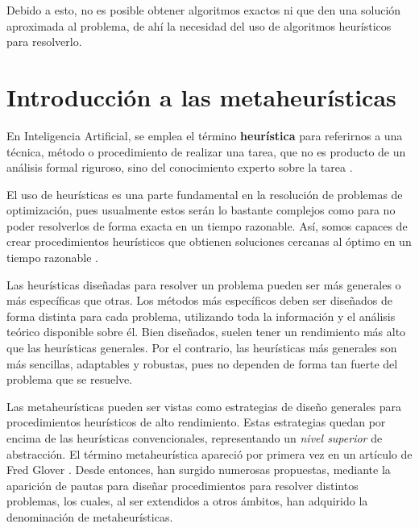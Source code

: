 Debido a esto, no es posible obtener algoritmos exactos ni que den una solución
aproximada al problema, de ahí la necesidad del uso de algoritmos heurísticos para
resolverlo.

\section{Introducción a las metaheurísticas}

En Inteligencia Artificial, se emplea el término \textbf{heurística} para referirnos
a una técnica, método o procedimiento de realizar una tarea, que no es producto de
un análisis formal riguroso, sino del conocimiento experto sobre la tarea \citep{melian:2003}.

El uso de heurísticas es una parte fundamental en la resolución de problemas de
optimización, pues usualmente estos serán lo bastante complejos como para no poder
resolverlos de forma exacta en un tiempo razonable. Así, somos capaces de crear
procedimientos heurísticos que obtienen soluciones cercanas al óptimo en un tiempo
razonable \citep{herrera:2014}.

Las heurísticas diseñadas para resolver un problema pueden ser más generales o más
específicas que otras. Los métodos más específicos deben ser diseñados de forma
distinta para cada problema, utilizando toda la información y el análisis teórico
disponible sobre él. Bien diseñados, suelen tener un rendimiento más alto que las
heurísticas generales. Por el contrario, las heurísticas más generales son más sencillas,
adaptables y robustas, pues no dependen de forma tan fuerte del problema que se resuelve.

Las metaheurísticas pueden ser vistas como estrategias de diseño generales para
procedimientos heurísticos de alto rendimiento. Estas estrategias quedan por encima
de las heurísticas convencionales, representando un \textit{nivel superior} de abstracción.
El término metaheurística apareció por primera vez en un artículo de Fred Glover
\citep{glover:1986}. Desde entonces, han surgido numerosas propuestas, mediante la
aparición de pautas para diseñar procedimientos para resolver distintos problemas,
los cuales, al ser extendidos a otros ámbitos, han adquirido la denominación de metaheurísticas.

